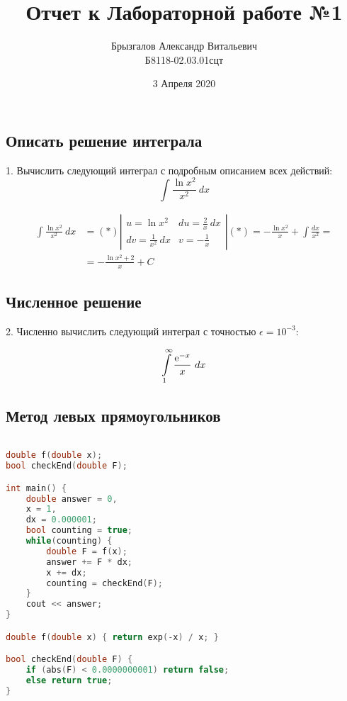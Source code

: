 \documentclass[14pt, titlepage, fleqn]{extarticle}
\title{Отчет к Лабораторной работе №1}
\author{Брызгалов Александр Витальевич\\Б8118-02.03.01сцт}
\date{3 Апреля 2020}
\begin{document}
	
	\maketitle
	
	\tableofcontents
	
	\newpage
	\subsection*{Описать решение интеграла}

	1. Вычислить следующий интеграл с подробным описанием всех действий:
	$$ \int \frac{\ln x^2}{x^2} ~ dx$$
	
	\begin{equation*}
		\begin{aligned}
			\int \frac{\ln x^2}{x^2} ~ dx &= (*) \left \vert
				\begin{matrix}
					u = \ln x^2 & du = \frac{2}{x}~dx\\
					dv = \frac{1}{x^2} ~ dx  & v = -\frac{1}{x}
				\end{matrix}
			\right \vert (*) = -\frac{\ln x^2}{x} + \int \frac{dx}{x^2} = \\ 
			&= -\frac{\ln x^2 + 2}{x} + C
		\end{aligned}
	\end{equation*}

	\newpage
	\subsection*{Численное решение}

	2. Численно вычислить следующий интеграл с точностью $\epsilon = 10^{-3}$:

	$$\int\limits_1^\infty  \frac{{\rm e}^{-x}}{x} ~ dx$$

	\subsection*{Метод левых прямоугольников}
	\begin{lstlisting}[language=C++, basicstyle=\footnotesize\ttfamily, frame = single]

double f(double x);
bool checkEnd(double F);

int main() {
	double answer = 0, 
	x = 1, 
	dx = 0.000001;
	bool counting = true;
	while(counting) {		
		double F = f(x);
		answer += F * dx;
		x += dx;
		counting = checkEnd(F);		
	}
	cout << answer;
}

double f(double x) { return exp(-x) / x; }

bool checkEnd(double F) {
	if (abs(F) < 0.0000000001) return false;
	else return true;
}
	
	\end{lstlisting}
		
\end{document}
